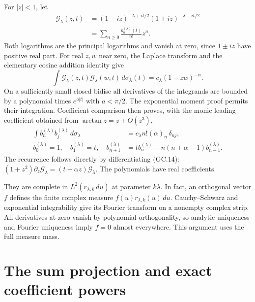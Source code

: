 \documentclass[11pt]{article}
\begin{document}
For $|z|<1$, let
\[
 \begin{split}
 \mathcal G_\lambda(z,t)
  &=(1-iz)^{-\lambda+it/2}(1+iz)^{-\lambda-it/2}\\
  &=\sum_{n\ge0}\frac{b_n^{(\lambda)}(t)}{n!}z^n.
 \end{split}                                                   \tag{GC.14}
\]
Both logarithms are the principal logarithms and vanish at zero,
since $1\pm iz$ have positive real part. For real $z,w$ near zero,
the Laplace transform and the elementary cosine addition identity give
\[
 \int\mathcal G_\lambda(z,t)\mathcal G_\lambda(w,t)
              \,d\sigma_\lambda(t)
 =c_\lambda(1-zw)^{-\alpha}.
\]
On a sufficiently small closed bidisc all derivatives of the
integrands are bounded by a polynomial times $e^{a|t|}$ with
$a<\pi/2$. The exponential moment proof permits their integration.
Coefficient comparison then proves, with the monic leading
coefficient obtained from $\arctan z=z+O(z^3)$,
\[
 \begin{split}
 \int b_n^{(\lambda)}b_j^{(\lambda)}\,d\sigma_\lambda
   &=c_\lambda n!(\alpha)_n\,\delta_{nj},\\
 b_0^{(\lambda)}=1,\quad b_1^{(\lambda)}=t,\quad
 b_{n+1}^{(\lambda)}
   &=t b_n^{(\lambda)}-n(n+\alpha-1)b_{n-1}^{(\lambda)}.
 \end{split}                                                   \tag{GC.15}
\]
The recurrence follows directly by differentiating (GC.14):
$(1+z^2)\partial_z\mathcal G_\lambda=(t-\alpha z)\mathcal G_\lambda$.
The polynomials have real coefficients.

They are complete in $L^2(r_{\lambda,k}\,du)$ at parameter $k\lambda$.
In fact, an orthogonal vector $f$ defines the finite complex measure
$f(u)r_{\lambda,k}(u)\,du$. Cauchy--Schwarz and exponential
integrability give its Fourier transform on a nonempty complex strip.
All derivatives at zero vanish by polynomial orthogonality, so
analytic uniqueness and Fourier uniqueness imply $f=0$ almost
everywhere. This argument uses the full measure mass.

\section{The sum projection and exact coefficient powers}
\end{document}
